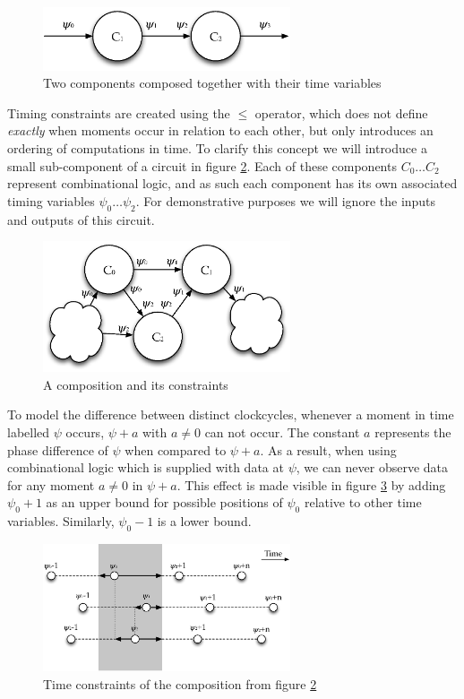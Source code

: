 \begin{figure}[h]
\centering
\includegraphics[width=0.65\textwidth]{images/compcomp}
\caption{Two components composed together with their time variables} \label{fig:dualcomp}
\end{figure}

Timing constraints are created using the $\le$ operator, which does not define \textit{exactly} when moments occur in relation to each other, but only introduces an ordering of computations in time.
To clarify this concept we will introduce a small sub-component of a circuit in figure \ref{fig:constraints1circuit}.
Each of these components $C_0 \ldots C_2$ represent combinational logic, and as such each component has its own associated timing variables $\psi_0 \ldots \psi_2$.
For demonstrative purposes we will ignore the inputs and outputs of this circuit.

\begin{figure}[h]
\centering
\includegraphics[width=0.65\textwidth]{images/constraints1circuit}
\caption{A composition and its constraints}
\label{fig:constraints1circuit}
\end{figure}

To model the difference between distinct clockcycles, whenever a moment in time labelled $\psi$ occurs, $\psi + a$ with $a \neq 0$ can not occur.
The constant $a$ represents the phase difference of $\psi$ when compared to $\psi+a$.
As a result, when using combinational logic which is supplied with data at $\psi$, we can never observe data for any moment $a \neq 0$ in $\psi + a$.
This effect is made visible in figure \ref{fig:constraints1} by adding $\psi_0 + 1$ as an upper bound for possible positions of $\psi_0$ relative to other time variables.
Similarly, $\psi_0 - 1$ is a lower bound.

\begin{figure}[h]
\centering
\includegraphics[width=0.65\textwidth]{images/constraints1}
\caption{Time constraints of the composition from figure \ref{fig:constraints1circuit}}
\label{fig:constraints1}
\end{figure}

